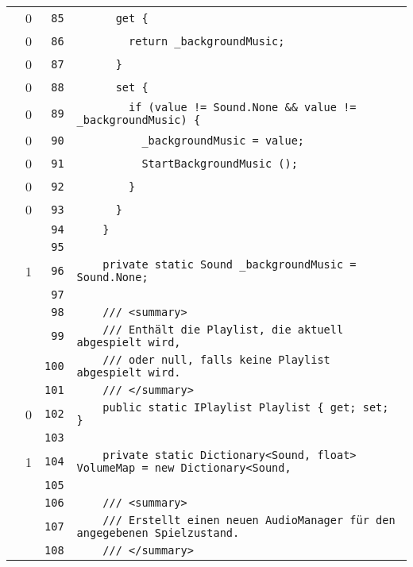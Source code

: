 \documentclass[a4paper,10pt]{article}
\begin{document}
\begin{longtable}[l]{lrrl}
\cellcolor{red} & 0 & \verb~85~ & \verb~      get {~\\
\cellcolor{red} & 0 & \verb~86~ & \verb~        return _backgroundMusic;~\\
\cellcolor{red} & 0 & \verb~87~ & \verb~      }~\\
\cellcolor{red} & 0 & \verb~88~ & \verb~      set {~\\
\cellcolor{red} & 0 & \verb~89~ & \verb~        if (value != Sound.None && value != _backgroundMusic) {~\\
\cellcolor{red} & 0 & \verb~90~ & \verb~          _backgroundMusic = value;~\\
\cellcolor{red} & 0 & \verb~91~ & \verb~          StartBackgroundMusic ();~\\
\cellcolor{red} & 0 & \verb~92~ & \verb~        }~\\
\cellcolor{red} & 0 & \verb~93~ & \verb~      }~\\
\cellcolor{gray} &  & \verb~94~ & \verb~    }~\\
\cellcolor{gray} &  & \verb~95~ & \verb~~\\
\cellcolor{green} & 1 & \verb~96~ & \verb~    private static Sound _backgroundMusic = Sound.None;~\\
\cellcolor{gray} &  & \verb~97~ & \verb~~\\
\cellcolor{gray} &  & \verb~98~ & \verb~    /// <summary>~\\
\cellcolor{gray} &  & \verb~99~ & \verb~    /// Enthält die Playlist, die aktuell abgespielt wird,~\\
\cellcolor{gray} &  & \verb~100~ & \verb~    /// oder null, falls keine Playlist abgespielt wird.~\\
\cellcolor{gray} &  & \verb~101~ & \verb~    /// </summary>~\\
\cellcolor{red} & 0 & \verb~102~ & \verb~    public static IPlaylist Playlist { get; set; }~\\
\cellcolor{gray} &  & \verb~103~ & \verb~~\\
\cellcolor{green} & 1 & \verb~104~ & \verb~    private static Dictionary<Sound, float> VolumeMap = new Dictionary<Sound, ~\\
\cellcolor{gray} &  & \verb~105~ & \verb~~\\
\cellcolor{gray} &  & \verb~106~ & \verb~    /// <summary>~\\
\cellcolor{gray} &  & \verb~107~ & \verb~    /// Erstellt einen neuen AudioManager für den angegebenen Spielzustand.~\\
\cellcolor{gray} &  & \verb~108~ & \verb~    /// </summary>~\\

\end{longtable}
\end{document}
